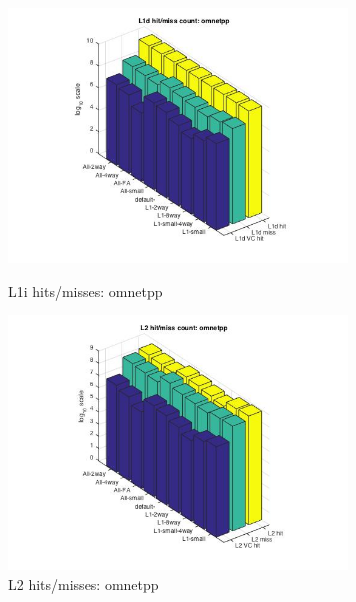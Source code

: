 \documentclass[11pt,titlepage]{article}
\begin{document}
          \begin{figure}[H]
          \centering
          \begin{minipage}{.45\textwidth}
            \includegraphics[width=9cm]{L1DHM_omnetpp}
            \caption{L1i hits/misses: omnetpp}
            \label{fig:L1DHM_omnetpp}
          \end{minipage}
          \begin{minipage}{.45\textwidth}
            \centering
            \includegraphics[width=9cm]{L2HM_omnetpp}
            \caption{L2 hits/misses: omnetpp}
            \label{fig:L2HM_omnetpp}
          \end{minipage}
    \end{figure}
\end{document}

